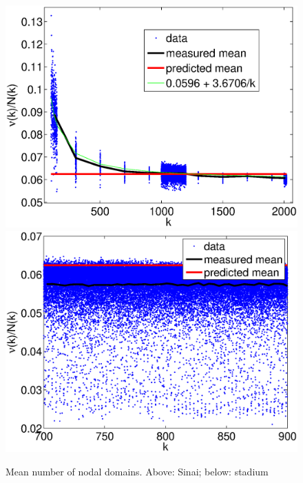 \documentclass{report}
\begin{document}
\begin{figure}
  \begin{center}
    \includegraphics[width=\textwidth]{figs/results/qugrs_all_mean.eps}
    \includegraphics[width=\textwidth]{figs/results/qust_700_to_900_mean.eps}
    \caption{Mean number of nodal domains. Above: Sinai; below: stadium}
    \label{fig:mean}
  \end{center}
\end{figure}
\end{document}
